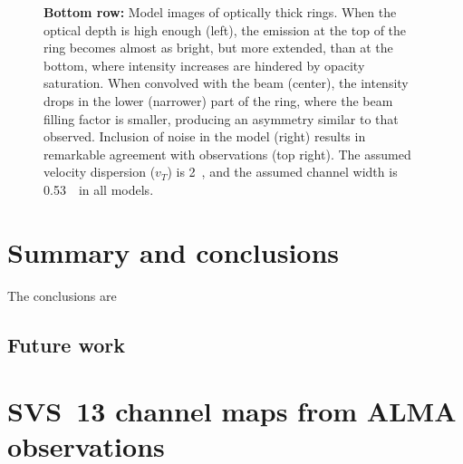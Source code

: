 \documentclass[12pt]{mythesis}
\begin{document}
\begin{figure}[p!]
{\bf Bottom row:}
 Model images of optically thick rings. When the optical depth is high enough (left), the emission at the top of the ring becomes almost as bright, but more extended, than at the bottom, where intensity increases are hindered by opacity saturation. When convolved with the beam (center), the intensity drops in the lower (narrower) part of the ring, where the beam filling factor is smaller, producing an asymmetry similar to that observed. Inclusion of noise in the model (right) results in remarkable agreement with observations (top right). The assumed velocity dispersion ($v_T$) is 2~\kms, and the assumed channel width is 0.53~\kms\ in all models. %

%
\label{fig:asymmetry}
\end{figure}




\chapter{Summary and conclusions}

The conclusions are

\section{Future work}


\appendix
\chapter{SVS~13 channel maps from ALMA observations}
\end{document}
